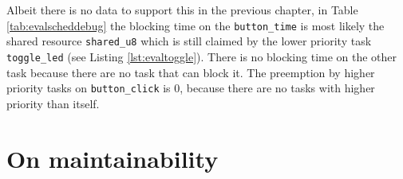 Albeit there is no data to support this in the previous chapter, in Table
\ref{tab:evalscheddebug} the blocking time on the \texttt{button\_time} is most
likely the shared resource \texttt{shared\_u8} which is still claimed by the
lower priority task \texttt{toggle\_led} (see Listing \ref{lst:evaltoggle}).
There is no blocking time on the other task because there are no task that can
block it. The preemption by higher priority tasks on \texttt{button\_click} is
0, because there are no tasks with higher priority than itself.

\section{On maintainability}
